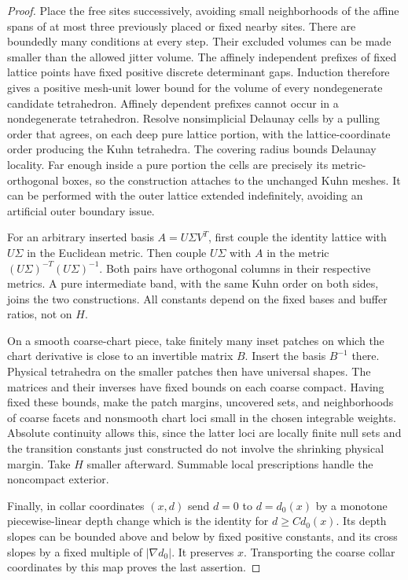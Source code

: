 \begin{proof}
Place the free sites successively, avoiding small neighborhoods of the
affine spans of at most three previously placed or fixed nearby sites.
There are boundedly many conditions at every step.  Their excluded
volumes can be made smaller than the allowed jitter volume.  The
affinely independent prefixes of fixed lattice points have fixed
positive discrete determinant gaps.  Induction therefore gives a
positive mesh-unit lower bound for the volume of every nondegenerate
candidate tetrahedron.  Affinely dependent prefixes cannot occur in a
nondegenerate tetrahedron.  Resolve nonsimplicial Delaunay cells by a
pulling order that agrees, on each deep pure lattice portion, with the
lattice-coordinate order producing the Kuhn tetrahedra.  The covering
radius bounds Delaunay locality.  Far enough inside a pure portion the
cells are precisely its metric-orthogonal boxes, so the construction
attaches to the unchanged Kuhn meshes.  It can be performed with the
outer lattice extended indefinitely, avoiding an artificial outer
boundary issue.

For an arbitrary inserted basis $A=U\Sigma V^T$, first couple the
identity lattice with $U\Sigma$ in the Euclidean metric.  Then couple
$U\Sigma$ with $A$ in the metric
$(U\Sigma)^{-T}(U\Sigma)^{-1}$.  Both pairs have orthogonal columns in
their respective metrics.  A pure intermediate band, with the same
Kuhn order on both sides, joins the two constructions.  All constants
depend on the fixed bases and buffer ratios, not on $H$.

On a smooth coarse-chart piece, take finitely many inset patches on
which the chart derivative is close to an invertible matrix $B$.
Insert the basis $B^{-1}$ there.  Physical tetrahedra on the smaller
patches then have universal shapes.  The matrices and their inverses
have fixed bounds on each coarse compact.  Having fixed these bounds,
make the patch margins, uncovered sets, and neighborhoods of coarse
facets and nonsmooth chart loci small in the chosen integrable
weights.  Absolute continuity allows this, since the latter loci are
locally finite null sets and the transition constants just constructed
do not involve the shrinking physical margin.  Take $H$ smaller
afterward.  Summable local prescriptions handle the noncompact
exterior.

Finally, in collar coordinates $(x,d)$ send $d=0$ to $d=d_0(x)$ by a
monotone piecewise-linear depth change which is the identity for
$d\ge C d_0(x)$.  Its depth slopes can be bounded above and below by
fixed positive constants, and its cross slopes by a fixed multiple of
$|\nabla d_0|$.  It preserves $x$.  Transporting the coarse collar
coordinates by this map proves the last assertion.
\end{proof}

